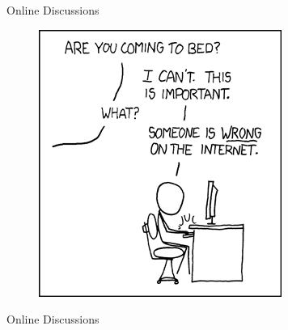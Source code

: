 \documentclass{beamer}
\begin{document}
\begin{frame}{Online Discussions}
\begin{figure}
	\includegraphics[height=.6\textheight]{fig/duty_calls.png}
\end{figure}
\end{frame}


\begin{frame}{Online Discussions}
\begin{figure}
\end{figure}
\end{frame}
\end{document}
